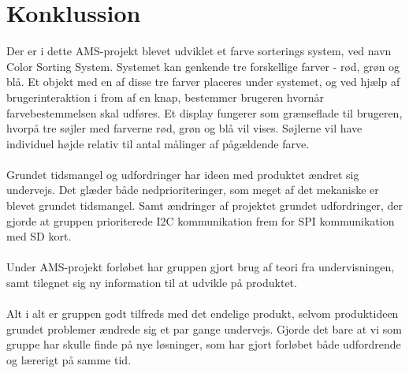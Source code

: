 \graphicspath{{Chapters/Konklussion/}}


\section{Konklussion}
Der er i dette AMS-projekt blevet udviklet et farve sorterings system, ved navn Color Sorting System. Systemet kan genkende tre forskellige farver - rød, grøn og blå. Et objekt med en af disse tre farver placeres under systemet, og ved hjælp af brugerinteraktion i from af en knap, bestemmer brugeren hvornår farvebestemmelsen skal udføres. Et display fungerer som grænseflade til brugeren, hvorpå tre søjler med farverne rød, grøn og blå vil vises. Søjlerne vil have individuel højde relativ til antal målinger af pågældende farve.  \\\\
Grundet tidsmangel og udfordringer har ideen med produktet ændret sig undervejs. Det glæder både nedprioriteringer, som meget af det mekaniske er blevet grundet tidsmangel. Samt ændringer af projektet grundet udfordringer, der gjorde at gruppen prioriterede I2C kommunikation frem for SPI kommunikation med SD kort. \\\\
Under AMS-projekt forløbet har gruppen gjort brug af teori fra undervisningen, samt tilegnet sig ny information til at udvikle på produktet. \\\\
Alt i alt er gruppen godt tilfreds med det endelige produkt, selvom produktideen grundet problemer ændrede sig et par gange undervejs. Gjorde det bare at vi som gruppe har skulle finde på nye løsninger, som har gjort forløbet både udfordrende og lærerigt på samme tid.
